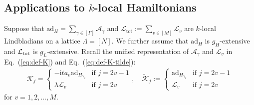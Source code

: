 \documentclass[aps,pra,reprint,groupedaddress,floatfix]{revtex4-2}
\newcommand{\eq}[1]{(\ref{eq:#1})}
\renewcommand{\i}{\mathrm{i}}
\renewcommand{\L}{\mathcal{L}}
\newcommand{\ad}{\mathrm{ad}}
\newcommand{\A}{\mathcal{A}}
\newcommand{\tot}{\mathrm{tot}}
\newcommand{\mc}{\mathcal}
\begin{document}
\subsection{Applications to $k$-local Hamiltonians}
\label{sec:local}
Suppose that $\ad_H=\sum_{\gamma\in[\Gamma]}\A_\gamma$ and $\mc L_{\tot}:=\sum_{v\in [M]}\mc L_v$ are $k$-local Lindbladians on a lattice $\Lambda = [N]$. We further assume that $\ad_H$ is $g_H$-extensive and $\L_{\rm tot}$ is $g_L$-extensive.
Recall the unified representation of $\mc A_{\gamma}$ and $\mc L_v$ in Eq.~\eq{def-K} and Eq.~\eq{def-K-tilde}: \begin{align*}
    \mathcal{K}_j = \begin{cases}-\i ta_{v}\ad_{H_{\gamma_v}} & \text{if } j = 2v-1 \\ \lambda\mathcal{L}_v & \text{if } j = 2v \end{cases}, \quad \tilde{\mathcal{K}}_j := \begin{cases}\ad_{H_{\gamma_v}} & \text{if } j = 2v-1\\ \mathcal{L}_v & \text{if } j = 2v \end{cases} 
\end{align*}
for $v=1, 2,\ldots, M$.  
\end{document}
